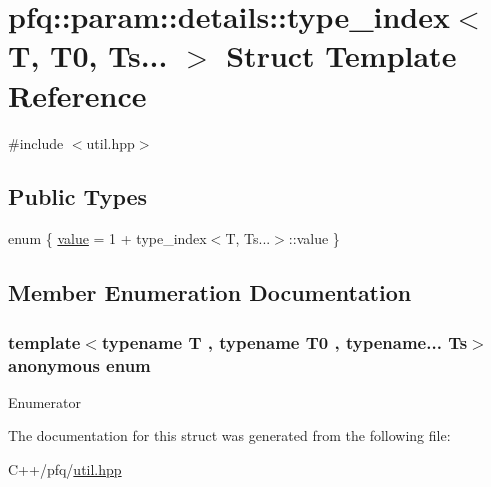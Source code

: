 \hypertarget{structpfq_1_1param_1_1details_1_1type__index_3_01T_00_01T0_00_01Ts_8_8_8_01_4}{}\section{pfq\+:\+:param\+:\+:details\+:\+:type\+\_\+index$<$ T, T0, Ts... $>$ Struct Template Reference}
\label{structpfq_1_1param_1_1details_1_1type__index_3_01T_00_01T0_00_01Ts_8_8_8_01_4}


{\ttfamily \#include $<$util.\+hpp$>$}

\subsection*{Public Types}
\begin{DoxyCompactItemize}
\item 
enum \{ \hyperlink{structpfq_1_1param_1_1details_1_1type__index_3_01T_00_01T0_00_01Ts_8_8_8_01_4_a6ff107e7b04e2b3add359d1ae3699e2baeff7991763d1fdf0ed2d33266d343bc6}{value} = 1 + type\+\_\+index$<$T, Ts...$>$\+:\+:value
 \}
\end{DoxyCompactItemize}


\subsection{Member Enumeration Documentation}
\subsubsection[{\texorpdfstring{anonymous enum}{anonymous enum}}]{\setlength{\rightskip}{0pt plus 5cm}template$<$typename T , typename T0 , typename... Ts$>$ anonymous enum}\hypertarget{structpfq_1_1param_1_1details_1_1type__index_3_01T_00_01T0_00_01Ts_8_8_8_01_4_a6ff107e7b04e2b3add359d1ae3699e2b}{}\label{structpfq_1_1param_1_1details_1_1type__index_3_01T_00_01T0_00_01Ts_8_8_8_01_4_a6ff107e7b04e2b3add359d1ae3699e2b}
\begin{Desc}
\item[Enumerator]\par
\begin{description}
\item[{\em 
value\hypertarget{structpfq_1_1param_1_1details_1_1type__index_3_01T_00_01T0_00_01Ts_8_8_8_01_4_a6ff107e7b04e2b3add359d1ae3699e2baeff7991763d1fdf0ed2d33266d343bc6}{}\label{structpfq_1_1param_1_1details_1_1type__index_3_01T_00_01T0_00_01Ts_8_8_8_01_4_a6ff107e7b04e2b3add359d1ae3699e2baeff7991763d1fdf0ed2d33266d343bc6}
}]\end{description}
\end{Desc}


The documentation for this struct was generated from the following file\+:\begin{DoxyCompactItemize}
\item 
C++/pfq/\hyperlink{util_8hpp}{util.\+hpp}\end{DoxyCompactItemize}
